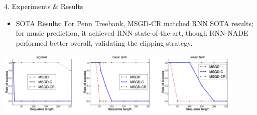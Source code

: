\begin{frame}[t]
\begin{columns}[t,totalwidth=\textwidth]
\begin{column}{0.3\textwidth}
\begin{block}{4. Experiments \& Results}
{\begin{itemize}
    \item SOTA Results: For Penn Treebank, MSGD-CR matched RNN SOTA results; for music prediction, it achieved RNN state-of-the-art, though RNN-NADE performed better overall, validating the clipping strategy. 
  \end{itemize}}  %
  \vspace{0.5cm}
\begin{center}
  \includegraphics[width=0.9\textwidth]{figures/results.png}
\end{center}
 \vspace{0.5cm}



    \end{block}

  

\end{column}
\end{columns}
\end{frame}
